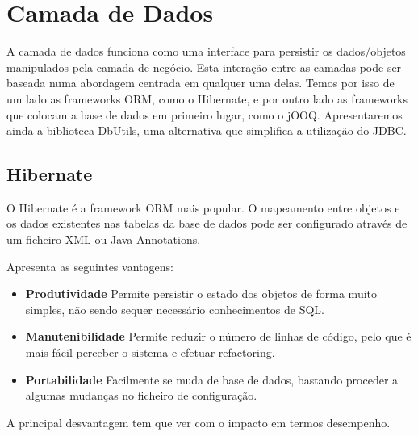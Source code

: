 \documentclass{article}
\begin{document}
\section{Camada de Dados}
A camada de dados funciona como uma interface para persistir os dados/objetos manipulados pela camada de negócio. Esta interação entre as camadas pode ser baseada numa abordagem centrada em qualquer uma delas. Temos por isso de um lado as frameworks ORM, como o Hibernate, e por outro lado as frameworks que colocam a base de dados em primeiro lugar, como o jOOQ. Apresentaremos ainda a biblioteca DbUtils, uma alternativa que simplifica a utilização do JDBC.

\subsection{Hibernate}

O Hibernate é a framework ORM mais popular. O mapeamento entre objetos e os dados existentes nas tabelas da base de dados pode ser configurado através de um ficheiro XML ou Java Annotations.\par
Apresenta as seguintes vantagens:
\begin{itemize}
\item \textbf{Produtividade} Permite persistir o estado dos objetos de forma muito simples, não sendo sequer necessário conhecimentos de SQL.
\item \textbf{Manutenibilidade} Permite reduzir o número de linhas de código, pelo que é mais fácil perceber o sistema e efetuar refactoring.
\item \textbf{Portabilidade} Facilmente se muda de base de dados, bastando proceder a algumas mudanças no ficheiro de configuração.
\end{itemize}
A principal desvantagem tem que ver com o impacto em termos desempenho.
\end{document}
